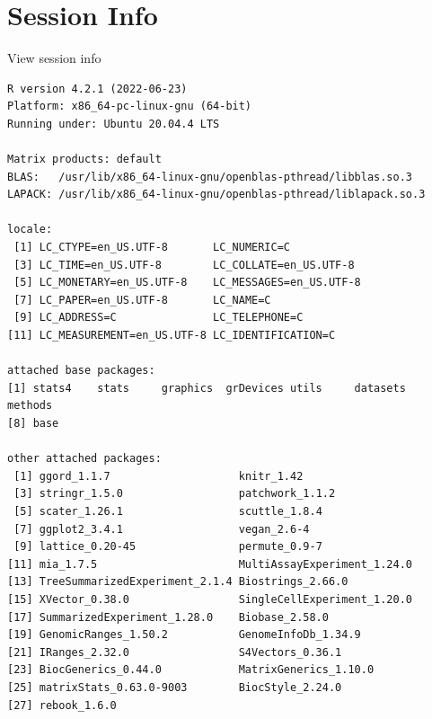 \documentclass[
]{book}
\begin{document}
\hypertarget{session-info-5}{%
\section*{Session Info}\label{session-info-5}}

View session info

\begin{verbatim}
R version 4.2.1 (2022-06-23)
Platform: x86_64-pc-linux-gnu (64-bit)
Running under: Ubuntu 20.04.4 LTS

Matrix products: default
BLAS:   /usr/lib/x86_64-linux-gnu/openblas-pthread/libblas.so.3
LAPACK: /usr/lib/x86_64-linux-gnu/openblas-pthread/liblapack.so.3

locale:
 [1] LC_CTYPE=en_US.UTF-8       LC_NUMERIC=C              
 [3] LC_TIME=en_US.UTF-8        LC_COLLATE=en_US.UTF-8    
 [5] LC_MONETARY=en_US.UTF-8    LC_MESSAGES=en_US.UTF-8   
 [7] LC_PAPER=en_US.UTF-8       LC_NAME=C                 
 [9] LC_ADDRESS=C               LC_TELEPHONE=C            
[11] LC_MEASUREMENT=en_US.UTF-8 LC_IDENTIFICATION=C       

attached base packages:
[1] stats4    stats     graphics  grDevices utils     datasets  methods  
[8] base     

other attached packages:
 [1] ggord_1.1.7                    knitr_1.42                    
 [3] stringr_1.5.0                  patchwork_1.1.2               
 [5] scater_1.26.1                  scuttle_1.8.4                 
 [7] ggplot2_3.4.1                  vegan_2.6-4                   
 [9] lattice_0.20-45                permute_0.9-7                 
[11] mia_1.7.5                      MultiAssayExperiment_1.24.0   
[13] TreeSummarizedExperiment_2.1.4 Biostrings_2.66.0             
[15] XVector_0.38.0                 SingleCellExperiment_1.20.0   
[17] SummarizedExperiment_1.28.0    Biobase_2.58.0                
[19] GenomicRanges_1.50.2           GenomeInfoDb_1.34.9           
[21] IRanges_2.32.0                 S4Vectors_0.36.1              
[23] BiocGenerics_0.44.0            MatrixGenerics_1.10.0         
[25] matrixStats_0.63.0-9003        BiocStyle_2.24.0              
[27] rebook_1.6.0                  


\end{verbatim}
\end{document}
